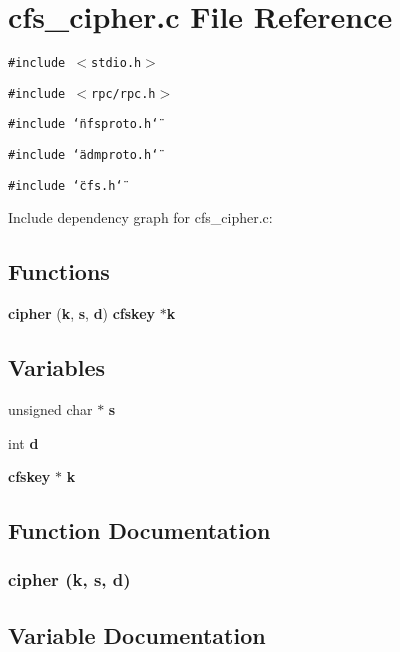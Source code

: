\section{cfs\_\-cipher.c File Reference}
\label{cfs__cipher_8c}


{\tt \#include $<$stdio.h$>$}\par
{\tt \#include $<$rpc/rpc.h$>$}\par
{\tt \#include \char`\"{}nfsproto.h\char`\"{}}\par
{\tt \#include \char`\"{}admproto.h\char`\"{}}\par
{\tt \#include \char`\"{}cfs.h\char`\"{}}\par


Include dependency graph for cfs\_\-cipher.c:\subsection*{Functions}
\begin{CompactItemize}
\item 
{\bf cipher} ({\bf k}, {\bf s}, {\bf d}) {\bf cfskey} $\ast${\bf k}
\end{CompactItemize}
\subsection*{Variables}
\begin{CompactItemize}
\item 
unsigned char $\ast$ {\bf s}
\item 
int {\bf d}
\item 
{\bf cfskey} $\ast$ {\bf k}
\end{CompactItemize}


\subsection{Function Documentation}
\subsubsection{\setlength{\rightskip}{0pt plus 5cm}cipher ({\bf k}, {\bf s}, {\bf d})}\label{cfs__cipher_8c_a3}




\subsection{Variable Documentation}
